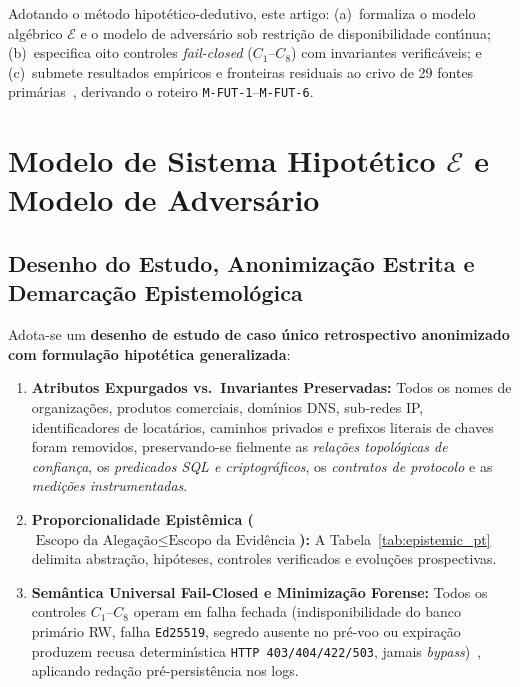 \documentclass[10pt,twocolumn]{article}
\begin{document}
Adotando o m\'{e}todo hipot\'{e}tico-dedutivo, este artigo: (a)~formaliza o modelo alg\'{e}brico $\mathcal{E}$ e o modelo de advers\'{a}rio sob restri\c{c}\~{a}o de disponibilidade cont\'{\i}nua; (b)~especifica oito controles \emph{fail-closed} ($C_1$--$C_8$) com invariantes verific\'{a}veis; e (c)~submete resultados emp\'{\i}ricos e fronteiras residuais ao crivo de 29 fontes prim\'{a}rias~\cite{R01,R02,R03,R04,R05,R06,R07,R08,R09,R10,R11,R12,R13,R14,R15,R16,R17,R18,R19,R20,R21,R22,R23,R24,R25,R26,R27,R28,R29}, derivando o roteiro \texttt{M-FUT-1}--\texttt{M-FUT-6}.

\section{Modelo de Sistema Hipot\'{e}tico $\mathcal{E}$ e Modelo de Advers\'{a}rio}

\subsection{Desenho do Estudo, Anonimiza\c{c}\~{a}o Estrita e Demarca\c{c}\~{a}o Epistemol\'{o}gica}

Adota-se um \textbf{desenho de estudo de caso \'{u}nico retrospectivo anonimizado com formula\c{c}\~{a}o hipot\'{e}tica generalizada}:
\begin{enumerate}[leftmargin=1.4em,itemsep=2pt,topsep=3pt]
  \item \textbf{Atributos Expurgados vs.\ Invariantes Preservadas:} Todos os nomes de organiza\c{c}\~{o}es, produtos comerciais, dom\'{\i}nios DNS, sub-redes IP, identificadores de locat\'{a}rios, caminhos privados e prefixos literais de chaves foram removidos, preservando-se fielmente as \emph{rela\c{c}\~{o}es topol\'{o}gicas de confian\c{c}a}, os \emph{predicados SQL e criptogr\'{a}ficos}, os \emph{contratos de protocolo} e as \emph{medi\c{c}\~{o}es instrumentadas}.
  \item \textbf{Proporcionalidade Epist\^{e}mica ($\text{Escopo da Alega\c{c}\~{a}o} \le \text{Escopo da Evid\^{e}ncia}$):} A Tabela~\ref{tab:epistemic_pt} delimita abstra\c{c}\~{a}o, hip\'{o}teses, controles verificados e evolu\c{c}\~{o}es prospectivas.
  \item \textbf{Sem\^{a}ntica Universal Fail-Closed e Minimiza\c{c}\~{a}o Forense:} Todos os controles $C_1$--$C_8$ operam em falha fechada (indisponibilidade do banco prim\'{a}rio RW, falha \texttt{Ed25519}, segredo ausente no pr\'{e}-voo ou expira\c{c}\~{a}o produzem recusa determin\'{\i}stica \texttt{HTTP 403/404/422/503}, jamais \emph{bypass})~\cite{R01}, aplicando reda\c{c}\~{a}o pr\'{e}-persist\^{e}ncia nos logs.
\end{enumerate}
\end{document}
